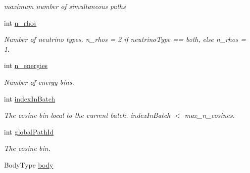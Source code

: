 \begin{DoxyCompactItemize}
\begin{DoxyCompactList}\small\item\em maximum number of simultaneous paths \end{DoxyCompactList}\item 
int \hyperlink{structcudanusquids_1_1Physics_a14e1d1807c009094fece720c8c133bfc}{n\+\_\+rhos}\hypertarget{structcudanusquids_1_1Physics_a14e1d1807c009094fece720c8c133bfc}{}\label{structcudanusquids_1_1Physics_a14e1d1807c009094fece720c8c133bfc}

\begin{DoxyCompactList}\small\item\em Number of neutrino types. n\+\_\+rhos = 2 if neutrino\+Type == both, else n\+\_\+rhos = 1. \end{DoxyCompactList}\item 
int \hyperlink{structcudanusquids_1_1Physics_a5510fc156904989b574ef8728ffc66b9}{n\+\_\+energies}\hypertarget{structcudanusquids_1_1Physics_a5510fc156904989b574ef8728ffc66b9}{}\label{structcudanusquids_1_1Physics_a5510fc156904989b574ef8728ffc66b9}

\begin{DoxyCompactList}\small\item\em Number of energy bins. \end{DoxyCompactList}\item 
int \hyperlink{structcudanusquids_1_1Physics_ae187b9d09cc0ab3ae25467d19dc295f2}{index\+In\+Batch}\hypertarget{structcudanusquids_1_1Physics_ae187b9d09cc0ab3ae25467d19dc295f2}{}\label{structcudanusquids_1_1Physics_ae187b9d09cc0ab3ae25467d19dc295f2}

\begin{DoxyCompactList}\small\item\em The cosine bin local to the current batch. index\+In\+Batch $<$ max\+\_\+n\+\_\+cosines. \end{DoxyCompactList}\item 
int \hyperlink{structcudanusquids_1_1Physics_a67cfd659f0d455b1df4d8a9305a6c9e0}{global\+Path\+Id}\hypertarget{structcudanusquids_1_1Physics_a67cfd659f0d455b1df4d8a9305a6c9e0}{}\label{structcudanusquids_1_1Physics_a67cfd659f0d455b1df4d8a9305a6c9e0}

\begin{DoxyCompactList}\small\item\em The cosine bin. \end{DoxyCompactList}\item 
Body\+Type \hyperlink{structcudanusquids_1_1Physics_a245c02808bbcd68274c72b5e72d8b6b9}{body}\hypertarget{structcudanusquids_1_1Physics_a245c02808bbcd68274c72b5e72d8b6b9}{}\label{structcudanusquids_1_1Physics_a245c02808bbcd68274c72b5e72d8b6b9}


\end{DoxyCompactItemize}
